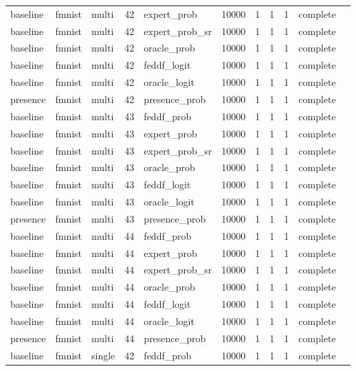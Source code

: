 \begin{tabular}{lllrlrrrrll}
baseline & fmnist & multi & 42 & expert\_prob & 10000 & 1 & 1 & 1 & complete &  \\
baseline & fmnist & multi & 42 & expert\_prob\_sr & 10000 & 1 & 1 & 1 & complete &  \\
baseline & fmnist & multi & 42 & oracle\_prob & 10000 & 1 & 1 & 1 & complete &  \\
baseline & fmnist & multi & 42 & feddf\_logit & 10000 & 1 & 1 & 1 & complete &  \\
baseline & fmnist & multi & 42 & oracle\_logit & 10000 & 1 & 1 & 1 & complete &  \\
presence & fmnist & multi & 42 & presence\_prob & 10000 & 1 & 1 & 1 & complete &  \\
baseline & fmnist & multi & 43 & feddf\_prob & 10000 & 1 & 1 & 1 & complete &  \\
baseline & fmnist & multi & 43 & expert\_prob & 10000 & 1 & 1 & 1 & complete &  \\
baseline & fmnist & multi & 43 & expert\_prob\_sr & 10000 & 1 & 1 & 1 & complete &  \\
baseline & fmnist & multi & 43 & oracle\_prob & 10000 & 1 & 1 & 1 & complete &  \\
baseline & fmnist & multi & 43 & feddf\_logit & 10000 & 1 & 1 & 1 & complete &  \\
baseline & fmnist & multi & 43 & oracle\_logit & 10000 & 1 & 1 & 1 & complete &  \\
presence & fmnist & multi & 43 & presence\_prob & 10000 & 1 & 1 & 1 & complete &  \\
baseline & fmnist & multi & 44 & feddf\_prob & 10000 & 1 & 1 & 1 & complete &  \\
baseline & fmnist & multi & 44 & expert\_prob & 10000 & 1 & 1 & 1 & complete &  \\
baseline & fmnist & multi & 44 & expert\_prob\_sr & 10000 & 1 & 1 & 1 & complete &  \\
baseline & fmnist & multi & 44 & oracle\_prob & 10000 & 1 & 1 & 1 & complete &  \\
baseline & fmnist & multi & 44 & feddf\_logit & 10000 & 1 & 1 & 1 & complete &  \\
baseline & fmnist & multi & 44 & oracle\_logit & 10000 & 1 & 1 & 1 & complete &  \\
presence & fmnist & multi & 44 & presence\_prob & 10000 & 1 & 1 & 1 & complete &  \\
baseline & fmnist & single & 42 & feddf\_prob & 10000 & 1 & 1 & 1 & complete &  \\

\end{tabular}
